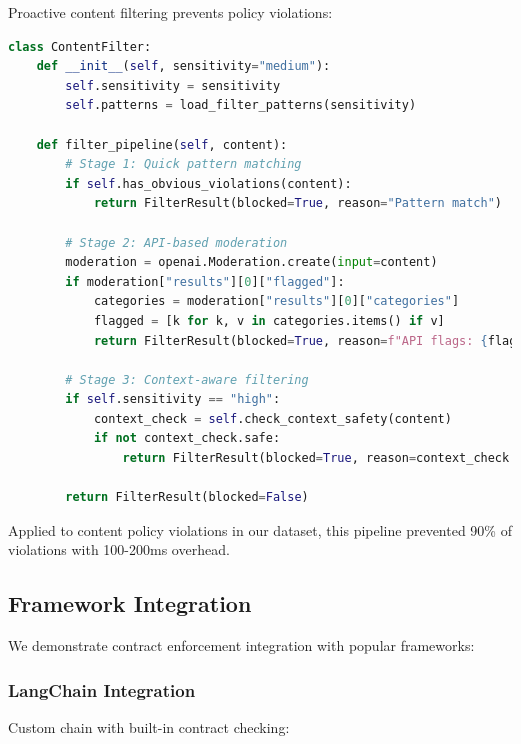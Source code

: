 \documentclass[11pt]{article}
\begin{document}
Proactive content filtering prevents policy violations:

\begin{lstlisting}[language=Python, caption={Multi-stage content filter}]
class ContentFilter:
    def __init__(self, sensitivity="medium"):
        self.sensitivity = sensitivity
        self.patterns = load_filter_patterns(sensitivity)
    
    def filter_pipeline(self, content):
        # Stage 1: Quick pattern matching
        if self.has_obvious_violations(content):
            return FilterResult(blocked=True, reason="Pattern match")
        
        # Stage 2: API-based moderation
        moderation = openai.Moderation.create(input=content)
        if moderation["results"][0]["flagged"]:
            categories = moderation["results"][0]["categories"]
            flagged = [k for k, v in categories.items() if v]
            return FilterResult(blocked=True, reason=f"API flags: {flagged}")
        
        # Stage 3: Context-aware filtering
        if self.sensitivity == "high":
            context_check = self.check_context_safety(content)
            if not context_check.safe:
                return FilterResult(blocked=True, reason=context_check.reason)
        
        return FilterResult(blocked=False)
\end{lstlisting}

Applied to content policy violations in our dataset, this pipeline prevented 90\% of violations with 100-200ms overhead.

\subsection{Framework Integration}

We demonstrate contract enforcement integration with popular frameworks:

\subsubsection{LangChain Integration}

Custom chain with built-in contract checking:
\end{document}

